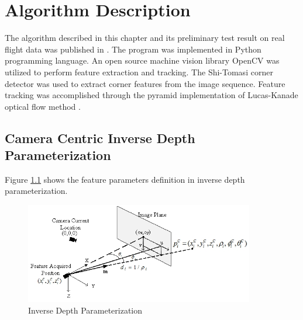 \chapter{Algorithm Description}\label{ch:algorithm}

The algorithm described in this chapter and its preliminary test
result on real flight data was published in
\cite{zhang_obstacle_2012}. The program was implemented in Python
programming language\cite{_python_????}. An open source machine
vision library OpenCV\cite{_opencv_????} was utilized to perform feature extraction and
tracking. The Shi-Tomasi corner detector \cite{shi_good_1994} was used
to extract corner features from the image sequence. Feature tracking
was accomplished through the pyramid implementation of Lucas-Kanade
optical flow method \cite{bouguet_pyramidal_1999}.

\section{Camera Centric Inverse Depth Parameterization}
Figure \ref{fig:algo1} shows the feature parameters definition in inverse
depth parameterization.

\begin{figure}[h]
\centering
\includegraphics[width=10cm, keepaspectratio=true]{./Figures/idp.jpg}
\caption{Inverse Depth Parameterization}
\label{fig:algo1}
\end{figure}

